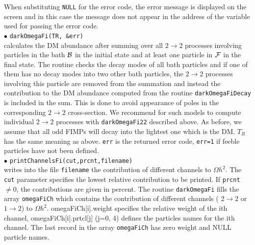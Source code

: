\documentclass[12pt,a4paper]{article}
\begin{document}
 When substituting \verb|NULL| for the error code, the error message is displayed on the screen and in this case the message does not appear in the address of the variable used for passing the error code.\\


\noindent
$\bullet$ \verb|darkOmegaFi(TR, &err)|  \\
calculates the  DM abundance after summing over all 
$2\to2$ processes involving  particles in the bath ${\cal B}$ in the initial state  and at least one particle in ${\cal F}$  in the final state. The routine checks the decay modes of all bath particles and if one of them has no decay modes into two other bath particles, the $2\to2$ processes involving this particle are removed from the summation and instead the contribution to the DM abundance computed from the routine \verb|darkOmegaFiDecay| is included in the sum.  This is done to avoid appearance of poles in the corresponding $2\to2$ cross-section. We recommend for such models to compute individual $2\to2$ processes with \verb|darkOmegaFi22| described above. As before, we assume that all odd FIMPs will decay into the lightest one which is the DM. $T_R$    has the same meaning as above.
{\tt err} is the returned error code, \verb|err=1| if feeble particles have not been defined. \\

\noindent
$\bullet$ \verb|printChannelsFi(cut,prcnt,filename)|  \\
writes into the file \verb|filename| the contribution of different channels to $\Omega h^2$. The \verb|cut| parameter specifies the lowest relative contribution to be printed.   If
\verb|prcnt| $\neq 0$, the contributions are given in percent.   
The routine \verb|darkOmegaFi| fills  the array      \verb|omegaFiCh| which contains the contribution of different channels ( $2\rightarrow 2$ or $1\rightarrow 2$) to $\Omega h^2$.
omegaFiCh[i].weight specifies the relative weight of the ith channel,
omegaFiCh[i].prtcl[j] (j=0, 4) defines the particles names for the ith channel.
The last record in the array  \verb|omegaFiCh| has zero weight and NULL particle names.\\
\end{document}
